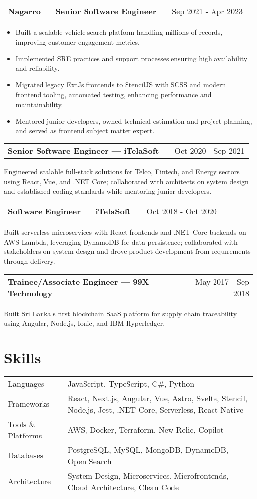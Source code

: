 \documentclass[a4paper,10pt]{article}
\makeatletter
\newenvironment{jobshort}[2]
    {
    \begin{tabularx}{\linewidth}{@{}l X r@{}}
    \textbf{#1} & \hfill &  #2 \\[3.75pt]
    \end{tabularx}
    }
    {
    }
\newenvironment{joblong}[2]
    {
    \begin{tabularx}{\linewidth}{@{}l X r@{}}
    \textbf{#1} & \hfill &  #2 \\[3.75pt]
    \end{tabularx}
    \begin{minipage}[t]{\linewidth}
    \begin{itemize}[nosep,after=\strut, leftmargin=1em, itemsep=3pt,label=--]
    }
    {
    \end{itemize}
    \end{minipage}    
    }
\makeatother
\begin{document}
\begin{joblong}{Nagarro — Senior Software Engineer}{Sep 2021 - Apr 2023}
\item Built a scalable vehicle search platform handling millions of records, improving customer engagement metrics.
\item Implemented SRE practices and support processes ensuring high availability and reliability.
\item Migrated legacy ExtJs frontends to StencilJS with SCSS and modern frontend tooling, automated testing, enhancing performance and maintainability.
\item Mentored junior developers, owned technical estimation and project planning, and served as frontend subject matter expert.
\end{joblong}

\begin{jobshort}{Senior Software Engineer — iTelaSoft}{Oct 2020 - Sep 2021}
Engineered scalable full-stack solutions for Telco, Fintech, and Energy sectors using React, Vue, and .NET Core; collaborated with architects on system design and established coding standards while mentoring junior developers.
\end{jobshort}

\begin{jobshort}{Software Engineer — iTelaSoft}{Oct 2018 - Oct 2020}
Built serverless microservices with React frontends and .NET Core backends on AWS Lambda, leveraging DynamoDB for data persistence; collaborated with stakeholders on system design and drove product development from requirements through delivery.
\end{jobshort}

\begin{jobshort}{Trainee/Associate Engineer — 99X Technology}{May 2017 - Sep 2018}
Built Sri Lanka's first blockchain SaaS platform for supply chain traceability using Angular, Node.js, Ionic, and IBM Hyperledger.
\end{jobshort}

\section{Skills}
\begin{tabularx}{\linewidth}{@{}l X@{}}
Languages &  \normalsize{JavaScript, TypeScript, C\#, Python}\\
Frameworks  &  \normalsize{React, Next.js, Angular, Vue, Astro, Svelte, Stencil, Node.js, Jest, .NET Core, Serverless, React Native}\\
Tools \& Platforms &  \normalsize{AWS, Docker, Terraform, New Relic, Copilot}\\
Databases &  \normalsize{PostgreSQL, MySQL, MongoDB, DynamoDB, Open Search}\\
Architecture &  \normalsize{System Design, Microservices, Microfrontends, Cloud Architecture, Clean Code}\\
\end{tabularx}
  
\end{document}

